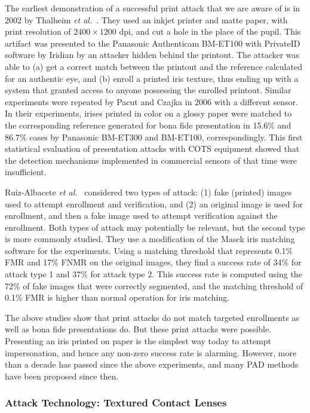 \documentclass[format=acmsmall, review=false, timestamp=false]{acmart}
\newcommand{\etal}{{\it et al.}~}
\begin{document}
The earliest demonstration of a successful print attack that we are aware of is in 2002 by Thalheim \etal \cite{Thalheim_CT_2002}. They used an inkjet printer {and} matte paper{,} with {print} resolution of $2400\times1200$ dpi, and cut a hole in the place of the pupil. This artifact was presented to the Panasonic Authenticam BM-ET100 with PrivateID software by Iridian by an attacker hidden behind the printout. The attacker was able to (a) get a correct match between the printout and the reference calculated for an authentic eye, and (b) enroll a printed iris texture, thus ending up with a system that granted access to anyone possessing the enrolled printout. Similar experiments were repeated by Pacut and Czajka in 2006 \cite{Pacut_ICCST_2006} with a different sensor. In their experiments, irises printed in {color on a glossy paper were  matched to the corresponding reference generated for bona fide presentation in 15.6\% and 86.7\% cases by Panasonic BM-ET300 and BM-ET100, correspondingly.} This first statistical evaluation of presentation attacks with COTS equipment showed that the detection mechanisms implemented in commercial sensors of that time were insufficient.

Ruiz-Albacete \etal \cite{Ruiz-Albacete_LNCS_2008} considered two types of attack: (1) {fake (printed)} images used to attempt enrollment and verification, and (2) an original image is used for enrollment, and then a {fake} image used to attempt verification against the enrollment. Both types of attack may potentially be relevant, but the second type is more commonly studied. They use a modification of the Masek iris matching software \cite{MASEK_SOFTWARE_URL} for the experiments. Using a matching threshold that represents 0.1\% FMR and 17\% FNMR on the original images, they find a success rate of 34\% for attack type 1 and 37\% for attack type 2. This success rate is computed using the 72\% of {fake} images that were correctly segmented, and the matching threshold of 0.1\% FMR is higher than normal operation for iris matching.

The above studies show that {print attacks do not match targeted enrollments as well as bona fide presentations do.} But these print attacks were possible. Presenting an iris printed on paper is the simplest way today to attempt impersonation, and hence any non-zero success rate is alarming. However, more than a decade has passed since the above experiments, and many PAD methods have been proposed since then.


\subsubsection{Attack Technology: Textured Contact Lenses}
\end{document}

